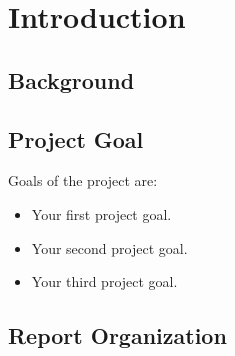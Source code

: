 \newpage
\section{Introduction}

\subsection{Background}
\lipsum[1-3]

\subsection{Project Goal}
Goals of the project are:
\begin{itemize}
  \item Your first project goal.
  \item Your second project goal.
  \item Your third project goal.
\end{itemize}

\subsection{Report Organization}
\lipsum[1]
